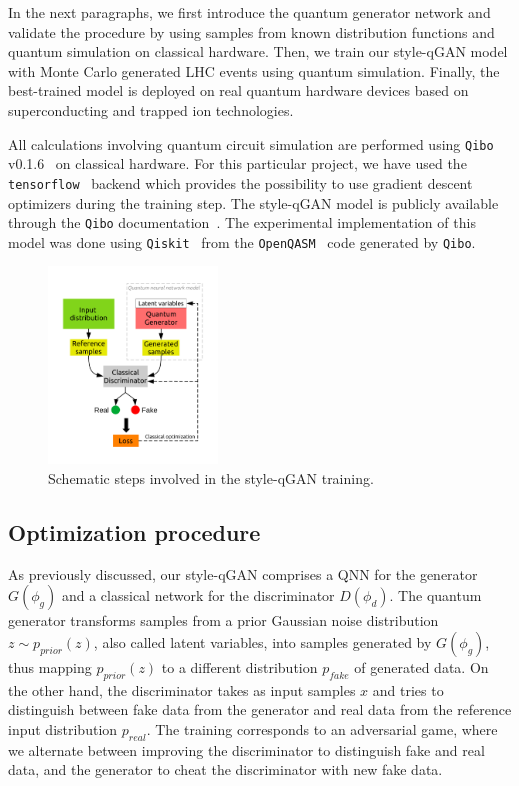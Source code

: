 \documentclass[twocolumn,preprintnumbers,superscriptaddress]{revtex4-2}
\begin{document}
In the next paragraphs, we first introduce the quantum
generator network and validate the procedure by using samples from known
distribution functions and quantum simulation on classical hardware. Then, we
train our style-qGAN model with Monte Carlo generated LHC events using quantum
simulation. Finally, the best-trained model is deployed on real quantum hardware
devices based on superconducting and trapped ion technologies.

All calculations involving quantum circuit simulation are performed using
{\tt Qibo} v0.1.6~\cite{efthymiou2020qibo,stavros_efthymiou_2021_5088103} on
classical hardware. For this particular project, we have used the {\tt
tensorflow}~\cite{tensorflow2015-whitepaper} backend which provides the
possibility to use gradient descent optimizers during the training step. The
style-qGAN model is publicly available through the {\tt Qibo}
documentation~\cite{add_cite_tutorial}. The experimental implementation of this
model was done using {\tt Qiskit}~\cite{gadi_aleksandrowicz_2019_2562111} from
the {\tt OpenQASM}~\cite{cross2017open} code generated by {\tt Qibo}.

\begin{figure}
  \includegraphics[width=0.4\textwidth]{plots/scheme.pdf}
  \caption{\label{fig:scheme} Schematic steps involved in the style-qGAN training.}
\end{figure}

\subsection{Optimization procedure}

As previously discussed, our style-qGAN comprises a QNN for the generator $G(\phi_g)$ and a classical network for the discriminator $D(\phi_d)$. The quantum generator transforms samples from a prior Gaussian noise distribution $z \sim p_{prior}(z)$, also called latent variables, into samples generated by $G(\phi_g)$, thus mapping $p_{prior}(z)$ to a different distribution $p_{fake}$ of generated data. On the other hand, the discriminator takes as input samples $x$ and tries to distinguish between fake data from the generator and real data from the reference input distribution $p_{real}$. The training corresponds to an adversarial game, where we alternate between improving the discriminator to distinguish fake and real data, and the generator to cheat the discriminator with new fake data.
\end{document}
